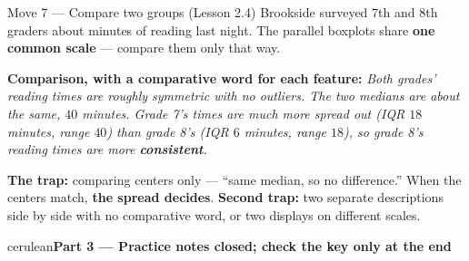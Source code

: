 \documentclass[10pt]{article}
\newcommand{\parthead}[1]{%
  \vspace{6pt}\noindent
  \begin{headlinebox}{cerulean}{\color{white}\bfseries #1}\end{headlinebox}%
  \vspace{4pt}}
\newcommand{\drawbox}[7]{%
  \draw[charcoal, thick] (#2,#1) -- (#3,#1);
  \draw[charcoal, thick] (#5,#1) -- (#6,#1);
  \draw[charcoal, thick] (#2,#1-0.15) -- (#2,#1+0.15);
  \draw[charcoal, thick] (#6,#1-0.15) -- (#6,#1+0.15);
  \filldraw[fill=frost, draw=cerulean, thick] (#3,#1-0.3) rectangle (#5,#1+0.3);
  \draw[cerulean, very thick] (#4,#1-0.3) -- (#4,#1+0.3);
  \node[left, font=\small\bfseries] at (#2-0.2,#1) {#7};}
\begin{document}
\vspace{3pt}
\boxguard[26]
\begin{notesbox}{Move 7 --- Compare two groups (Lesson 2.4)}
\small
Brookside surveyed $7$th and $8$th graders about minutes of reading last night. The parallel
boxplots share \textbf{one common scale} --- compare them only that way.

\vspace{2pt}
\begin{center}
\end{center}

\textbf{Comparison, with a comparative word for each feature:} \emph{Both grades' reading
times are roughly symmetric with no outliers. The two medians are about the same, $40$
minutes. Grade 7's times are much more spread out (IQR $18$ minutes, range $40$) than grade 8's
(IQR $6$ minutes, range $18$), so grade 8's reading times are more \textbf{consistent}.}

\vspace{3pt}
\textbf{The trap:} comparing centers only --- ``same median, so no difference.'' When the
centers match, \textbf{the spread decides}. \textbf{Second trap:} two separate descriptions
side by side with no comparative word, or two displays on different scales.
\end{notesbox}
\normalsize

\newpage
\parthead{Part 3 --- Practice \hfill notes closed; check the key only at the end}
\end{document}
